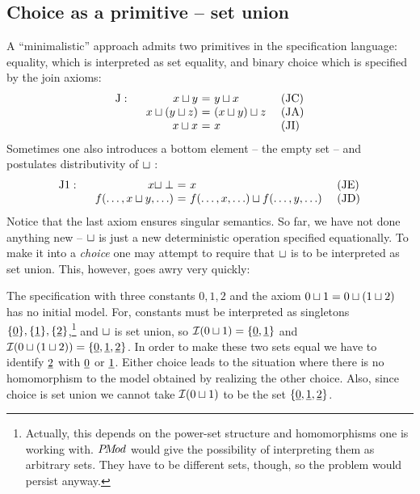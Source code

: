 {\subsection{Choice as a primitive -- set union}\label{sub:primitive}
A ``minimalistic'' approach \cite{c:63, c:77} admits two primitives in the specification language: 
equality, which is 
interpreted as set equality, and binary choice which is specified by the join axioms:
\[
\begin{array}{r@{\ \ \ \ \ }r@{\ =\ }l@{\ \ \ \ }l}
{\rm J:} & x\ch y & y\ch x & {\rm (JC)} \\
 & x\ch(y\ch z) & (x\ch y)\ch z & {\rm (JA)} \\
 & x\ch x & x & {\rm (JI)}
 \end{array}
 \]
Sometimes one also introduces a bottom element -- the empty set 
\cite{c:50} -- and 
postulates distributivity of $\sqcup$ \cite{c:63, c:91}:
\[
\begin{array}{r@{\ \ \ \ \ }r@{\ =\ }l@{\ \ \ \ }l}
{\rm J1:} & x\ch \perp & x & {\rm (JE)} \\
 & f(\ldots,x\ch y,\ldots) & f(\ldots,x,\ldots)\ch f(\ldots,y,\ldots) & 
 {\rm (JD)} 
  \end{array}
\] Notice that the last axiom ensures singular semantics.  So far, we have 
not done anything new -- $\sqcup$ is just a new deterministic operation 
specified equationally.  To make it into a {\em choice\/} one may attempt 
to require that $\sqcup$ is to be interpreted as set union.  This, however, 
goes awry very quickly:

\begin{Example}\label{ex:union} 
The specification with three constants $0,1,2$ and the axiom $0\sqcup 1 = 
0\sqcup (1\sqcup 2)$ has no initial model. For, 
constants must be interpreted as singletons $\{\underline{0}\},\{\underline{1}\},\{\underline{2}\}$,\footnote{Actually, this depends on the power-set 
structure and homomorphisms one is working with. $P\!M\!od$ would give 
the possibility of interpreting them as arbitrary sets. They have to 
be different sets, though, so the problem would persist anyway.} and $\sqcup$ is set union, so ${\cal I}(0\sqcup 1) = 
\{\underline{0},\underline{1}\}$ and 
${\cal I}(0\sqcup(1\sqcup 2)) = \{\underline{0},\underline{1},\underline{2}\}$.  In order to make
these two sets equal we have to identify $\underline{2}$ with $\underline{0}$ or
$\underline{1}$.  Either choice leads to the situation where there is no
homomorphism to the model obtained by realizing the other
choice. Also, since choice is set union we cannot take ${\cal I}(0\sqcup 1)$
to be the set $\{\underline{0},\underline{1},\underline{2}\}$.
\end{Example}

}
